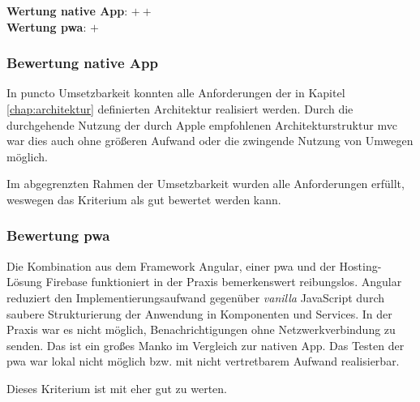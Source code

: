 \textbf{Wertung native App}: $++$ \\
\textbf{Wertung \ac{pwa}}: $+$

\subsubsection{Bewertung native App}
In puncto Umsetzbarkeit konnten alle Anforderungen der in Kapitel \ref{chap:architektur} definierten Architektur realisiert werden. Durch die durchgehende Nutzung der durch Apple empfohlenen Architekturstruktur \ac{mvc} war dies auch ohne größeren Aufwand oder die zwingende Nutzung von Umwegen möglich.

Im abgegrenzten Rahmen der Umsetzbarkeit wurden alle Anforderungen erfüllt, weswegen das Kriterium als gut bewertet werden kann.

\subsubsection{Bewertung \ac{pwa}}
Die Kombination aus dem Framework Angular, einer \ac{pwa} und der Hosting-Lösung Firebase funktioniert in der Praxis bemerkenswert reibungslos. Angular reduziert den Implementierungsaufwand gegenüber \textit{vanilla} JavaScript durch saubere Strukturierung der Anwendung in Komponenten und Services. In der Praxis war es nicht möglich, Benachrichtigungen ohne Netzwerkverbindung zu senden. Das ist ein großes Manko im Vergleich zur nativen App. Das Testen der \ac{pwa} war lokal nicht möglich bzw. mit nicht vertretbarem Aufwand realisierbar.

Dieses Kriterium ist mit eher gut zu werten.

